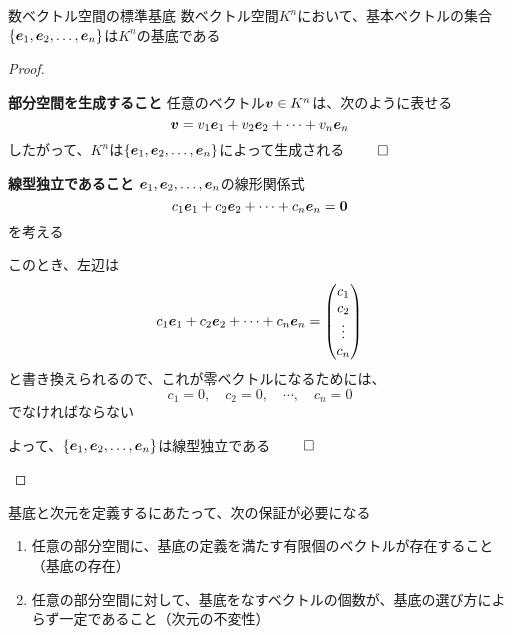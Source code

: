 \documentclass[../../../topic_linear-algebra]{subfiles}
\begin{document}
\begin{theorem}{数ベクトル空間の標準基底}
  数ベクトル空間$K^n$において、基本ベクトルの集合$\{ \vb*{e}_1, \vb*{e}_2, \dots, \vb*{e}_n \}$は$K^n$の基底である
\end{theorem}

\begin{proof}
  \begin{subpattern}{\bfseries 部分空間を生成すること}
    任意のベクトル$\vb*{v} \in K^n$は、次のように表せる
    \begin{equation*}
      \vb*{v} = v_1 \vb*{e}_1 + v_2 \vb*{e}_2 + \cdots + v_n \vb*{e}_n
    \end{equation*}
    したがって、$K^n$は$\{ \vb*{e}_1, \vb*{e}_2, \dots, \vb*{e}_n \}$によって生成される $\qed$
  \end{subpattern}

  \begin{subpattern}{\bfseries 線型独立であること}
    $\vb*{e}_1, \vb*{e}_2, \dots, \vb*{e}_n$の線形関係式
    \begin{equation*}
      c_1 \vb*{e}_1 + c_2 \vb*{e}_2 + \cdots + c_n \vb*{e}_n = \vb*{0}
    \end{equation*}
    を考える

    このとき、左辺は
    \begin{equation*}
      c_1 \vb*{e}_1 + c_2 \vb*{e}_2 + \cdots + c_n \vb*{e}_n = \begin{pmatrix}
        c_1    \\
        c_2    \\
        \vdots \\
        c_n
      \end{pmatrix}
    \end{equation*}
    と書き換えられるので、これが零ベクトルになるためには、
    \begin{equation*}
      c_1 = 0, \quad c_2 = 0, \quad \cdots, \quad c_n = 0
    \end{equation*}
    でなければならない

    よって、$\{ \vb*{e}_1, \vb*{e}_2, \dots, \vb*{e}_n \}$は線型独立である $\qed$
  \end{subpattern}
\end{proof}

\sectionline

基底と次元を定義するにあたって、次の保証が必要になる

\begin{enumerate}[label=\romanlabel]
  \item 任意の部分空間に、基底の定義を満たす有限個のベクトルが存在すること（基底の存在）
  \item 任意の部分空間に対して、基底をなすベクトルの個数が、基底の選び方によらず一定であること（次元の不変性）
\end{enumerate}
\end{document}
